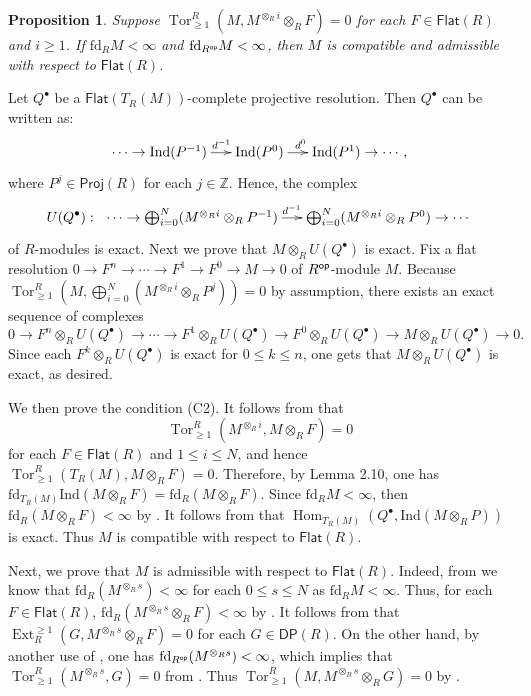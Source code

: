 \documentclass[10pt,twoside]{amsart}
\theoremstyle{bfupright head,slanted body}
\theoremstyle{bfupright head,upright body}
\theoremstyle{fixed bf head,slanted body}
\newtheorem{prp}[res]{Proposition}      \newtheorem*{prp*}{Proposition}
\theoremstyle{fixed bf head,upright body}
\theoremstyle{numbered paragraph}
\newenvironment{prf*}[1][Proof]{%
  \begin{proof}[\bf #1]
    \setcounter{equation}{0}
    \renewcommand{\theequation}{\arabic{equation}}}
  {\end{proof}
  }
\numberwithin{equation}{res}
\newcommand{\DP}{\mathsf{DP}}
\newcommand{\Proj}{\mathsf{Proj}}
\newcommand{\fd}{\mathrm{fd}}
\newcommand{\Flat}{\mathsf{Flat}}
\newcommand{\Ind}{\mathrm{Ind}}
\newcommand{\Rop}{R^{\sf op}}
\newcommand{\Hom}{\operatorname{Hom}}
\newcommand{\Ext}{\operatorname{Ext}}
\newcommand{\Tor}{\operatorname{Tor}}
\begin{document}
\begin{prp} \label{example of admissible and compatible}
Suppose $\Tor_{\geqslant 1}^R(M, M^{\otimes_Ri}\otimes_R F)=0$
for each $F\in \Flat(R)$ and $i \geqslant 1$.
If $\fd_RM<\infty$ and $\fd_{\Rop}M<\infty$,
then $M$ is compatible and admissible with respect to $\Flat(R)$.
\end{prp}
\begin{prf*}
Let $Q^\bullet$ be a $\Flat(T_R(M))$-complete projective resolution.
Then $Q^\bullet$ can be written as:
$$\xymatrix@C=0.5cm{
\cdots \to \Ind(P^{-1}) \ar[r]^{\qquad d^{-1}\,\,} & \Ind(P^0)
\ar[r]^{d^0 \quad \,\,} & \Ind(P^1) \to \cdots,}$$
where $P^j \in \Proj(R)$ for each $j \in \mathbb{Z}$. Hence, the complex
$$U(Q^\bullet):\ \xymatrix@C=0.5cm{\cdots \to \bigoplus_{i=0}^N(M^{\otimes_Ri}\otimes_RP^{-1})
\ar[r]^{\,\, d^{-1}} &
\bigoplus_{i=0}^N(M^{\otimes_Ri}\otimes_RP^0) \to \cdots}$$ of $R$-modules is exact.
Next we prove that $M\otimes_R U(Q^\bullet)$ is exact.
Fix a flat resolution
$0 \to F^n \to \cdots \to  F^1 \to  F^0 \to M \to 0$ of $\Rop$-module $M$.
Because $\Tor_{\geqslant 1}^R(M,\bigoplus_{i=0}^N(M^{\otimes_Ri}\otimes_RP^j))=0$
by assumption, there exists an exact sequence of complexes
$$0 \to F^n\otimes_R U(Q^\bullet) \to \cdots \to  F^1\otimes_R U(Q^\bullet) \to
F^0\otimes_R U(Q^\bullet) \to M\otimes_R U(Q^\bullet) \to 0.$$
Since each $F^k\otimes_R U(Q^\bullet)$ is exact for $0\leqslant k\leqslant n$,
one gets that $M\otimes_R U(Q^\bullet)$ is exact, as desired.

We then prove the condition (C2). It follows from \cite[Lemma 2.4]{DL} that
$$\Tor_{\geqslant 1}^R(M^{\otimes_Ri},M\otimes_R F)=0$$
for each $F \in \Flat(R)$ and $1\leqslant i\leqslant N$,
and hence $\Tor_{\geqslant 1}^R(T_R(M),M\otimes_R F)=0$.
Therefore, by Lemma 2.10, one has $\fd_{T_R(M)}\Ind(M\otimes_R F)=\fd_R(M\otimes_R F)$.
Since $\fd_RM<\infty$, then $\fd_R(M\otimes_R F)<\infty$ by \cite[Lemma 3.2(2)]{2022Mao}. 
It follows from \cite[Lemma 3.1]{2022Mao} that $\Hom_{T_R(M)}(Q^\bullet,\Ind(M\otimes_RP))$ is exact.
Thus $M$ is compatible with respect to $\Flat(R)$.

Next, we prove that $M$ is admissible with respect to $\Flat(R)$.
Indeed, from \cite[Lemma 2.5]{DL} we know that $\fd_R(M^{\otimes_Rs})<\infty$ for each $0\leqslant s \leqslant N$ as $\fd_RM<\infty$. Thus, for each $F\in\Flat(R)$, $\fd_R(M^{\otimes_Rs}\otimes_R F)<\infty$ by \cite[Lemma 3.2(2)]{2022Mao}.
It follows from \cite[Lemma 3.1]{2022Mao} that $\Ext_R^{\geqslant 1}(G, M^{\otimes_Rs}\otimes_R F)=0$
for each $G \in \DP(R)$.
On the other hand, by another use of \cite[Lemma 2.5]{DL}, one has $\fd_{\Rop}(M^{\otimes_Rs})<\infty$,
which implies that $\Tor_{\geqslant 1}^R(M^{\otimes_Rs}, G)=0$ from \cite[Lemma 2.3]{EIT}.
Thus $\Tor_{\geqslant 1}^R(M,M^{\otimes_Rs}\otimes_RG)=0$ by \cite[Lemma 2.4]{DL}. 
\end{prf*}
\end{document}
